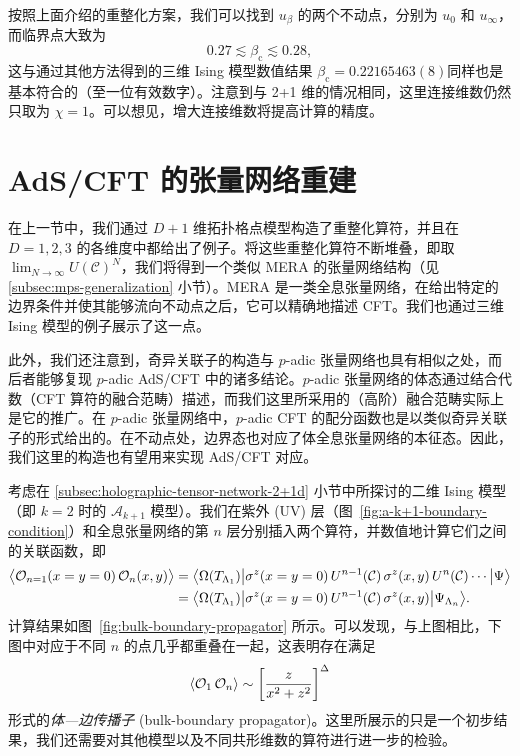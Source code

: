 按照上面介绍的重整化方案，我们可以找到 $u_\beta$ 的两个不动点，分别为 $u_0$ 和 $u_\infty$，而临界点大致为
\begin{equation}
  0.27 \lesssim \beta_{\text{c}} \lesssim 0.28,
\end{equation}
这与通过其他方法得到的三维 Ising 模型数值结果 $\beta_{\text{c}}=0.22165463(8)$\cite{hasenbusch2010finite}同样也是基本符合的（至一位有效数字）。注意到与 2+1 维的情况相同，这里连接维数仍然只取为 $\chi=1$。可以想见，增大连接维数将提高计算的精度。

\section{AdS/CFT 的张量网络重建}
\label{sec:ads-cft-tensor-network}

在上一节中，我们通过 $D+1$ 维拓扑格点模型构造了重整化算符，并且在 $D=1,2,3$ 的各维度中都给出了例子。将这些重整化算符不断堆叠，即取 $\lim_{N\to\infty}U(\mathcal{C})^N$，我们将得到一个类似 MERA 的张量网络结构（见 \ref{subsec:mps-generalization} 小节）。MERA 是一类全息张量网络，在给出特定的边界条件并使其能够流向不动点之后，它可以精确地描述 CFT。我们也通过三维 Ising 模型的例子展示了这一点。

此外，我们还注意到，奇异关联子的构造与 $p$-adic 张量网络也具有相似之处，而后者能够复现 $p$-adic AdS/CFT 中的诸多结论\cite{hung2019padic,chen2021emergent,chen2021bending1,chen2021bending2}。$p$-adic 张量网络的体态通过结合代数（CFT 算符的融合范畴）描述，而我们这里所采用的（高阶）融合范畴实际上是它的推广。在 $p$-adic 张量网络中，$p$-adic CFT 的配分函数也是以类似奇异关联子的形式给出的。在不动点处，边界态也对应了体全息张量网络的本征态。因此，我们这里的构造也有望用来实现 AdS/CFT 对应。


考虑在 \ref{subsec:holographic-tensor-network-2+1d} 小节中所探讨的二维 Ising 模型（即 $k=2$ 时的 $\mathcal{A}_{k+1}$ 模型）。我们在紫外 (UV) 层（图~\ref{fig:a-k+1-boundary-condition}）和全息张量网络的第 $n$ 层分别插入两个算符，并数值地计算它们之间的关联函数，即
\begin{align}
     \ev[\big]{\mathcal{O}_{n=1}(x=y=0) \, \mathcal{O}_n(x,y)}
  &= \bigl\langle \Omega(T_{\Lambda_1}) \big|
     \sigma^z(x=y=0) \, U^{n-1}(\mathcal{C}) \, \sigma^z(x,y) \, U^n(\mathcal{C}) \cdots
     \big| \Psi \bigr\rangle \notag \\
  &= \bigl\langle \Omega(T_{\Lambda_1}) \big|
     \sigma^z(x=y=0) \, U^{n-1}(\mathcal{C}) \, \sigma^z(x,y)
     \big| \Psi_{\Lambda_n} \bigr\rangle.
\end{align}
计算结果如图~\ref{fig:bulk-boundary-propagator} 所示。可以发现，与上图相比，下图中对应于不同 $n$ 的点几乎都重叠在一起，这表明存在满足
\begin{equation}
  \ev{\mathcal{O}_1 \, \mathcal{O}_n} \sim \left[ \frac{z}{x^2+z^2} \right]^\Delta
\end{equation}
形式的\emph{体—边传播子} (bulk-boundary propagator)。这里所展示的只是一个初步结果，我们还需要对其他模型以及不同共形维数的算符进行进一步的检验。

